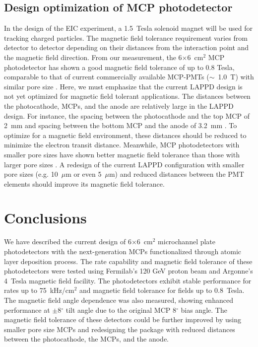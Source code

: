 \documentclass[preprint,5p]{elsarticle}
\begin{document}
\subsection{Design optimization of MCP photodetector}\label{subsec_opt}
In the design of the EIC experiment, a 1.5~Tesla solenoid magnet will be used 
for tracking charged particles. The magnetic field tolerance requirement varies 
from detector to detector depending on their distances from the interaction 
point and the magnetic field direction. From our measurement, the 
6$\times$6~cm$^2$ MCP photodetector has shown a good magnetic field 
tolerance of up to 0.8 Tesla, comparable to that of current commercially 
available MCP-PMTs ($\sim$~1.0~T) with similar pore size \cite{MCPs-B}. Here, 
we must emphasize that the current LAPPD design is not yet optimized for 
magnetic field tolerant applications. The distances between the photocathode, 
MCPs, and the anode are relatively large in the LAPPD design. For instance, the 
spacing between the photocathode and the top MCP of 2~mm and spacing between 
the bottom MCP and the anode of 3.2~mm \cite{Wang-MCPs}. To optimize for a 
magnetic field environment, these distances should be reduced to minimize the 
electron transit distance. Meanwhile, MCP photodetectors with smaller pore 
sizes have shown better magnetic field tolerance than those with larger pore 
sizes \cite{MCPs-B, Lehmann, Ilieva}. A redesign of the current LAPPD 
configuration with smaller pore sizes (e.g.  10~$\mu$m or even 5~$\mu$m) and 
reduced distances between the PMT elements should improve its magnetic field 
tolerance. 

\section{Conclusions}
We have described the current design of 6$\times$6~cm$^2$ microchannel plate 
photodetectors with the next-generation MCPs functionalized through atomic 
layer deposition process. The rate capability and magnetic field tolerance of 
these photodetectors were tested using Fermilab's 120 GeV proton beam and 
Argonne's 4~Tesla magnetic field facility. The photodetectors exhibit stable 
performance for rates up to 75~kHz/cm$^2$ and magnetic field tolerance for 
fields up to 0.8~Tesla. The magnetic field angle dependence was also measured, 
showing enhanced performance at $\pm$8$^{\circ}$ tilt angle due to the original 
MCP 8$^{\circ}$ bias angle. The magnetic field tolerance of these detectors 
could be further improved by using smaller pore size MCPs and redesigning the 
package with reduced distances between the photocathode, the MCPs, and the 
anode.
 
\end{document}
